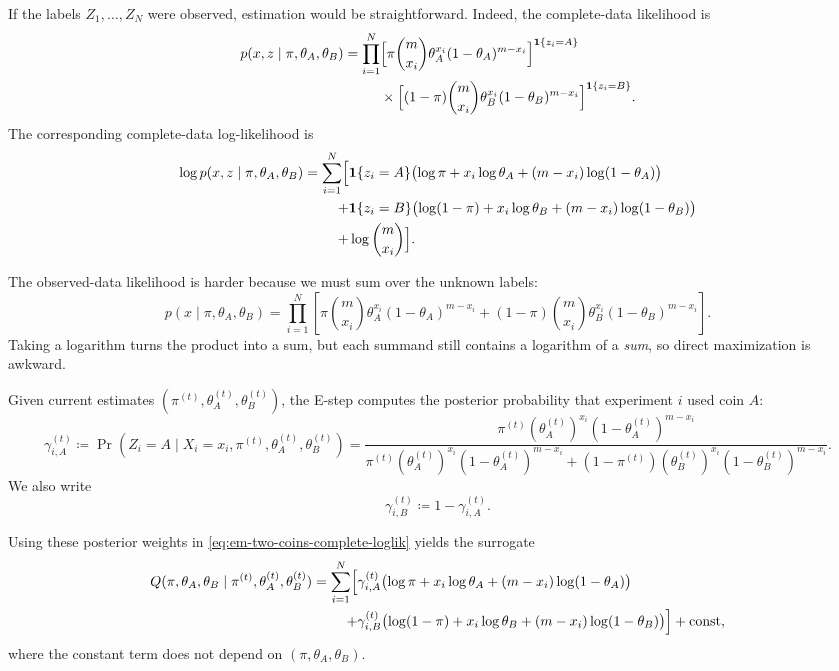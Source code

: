 \documentclass[11pt]{article}
\begin{document}
If the labels $Z_1,\dots,Z_N$ were observed, estimation would be straightforward.
Indeed, the complete-data likelihood is
\begin{align}
  p(x,z\mid \pi,\theta_A,\theta_B)
  =
  \prod_{i=1}^N
  &\Bigl[
    \pi \binom{m}{x_i}\theta_A^{x_i}(1-\theta_A)^{m-x_i}
  \Bigr]^{\mathbf{1}\{z_i=A\}}
  \nonumber\\
  &\times
  \Bigl[
    (1-\pi)\binom{m}{x_i}\theta_B^{x_i}(1-\theta_B)^{m-x_i}
  \Bigr]^{\mathbf{1}\{z_i=B\}}.
  \label{eq:em-two-coins-complete}
\end{align}
The corresponding complete-data log-likelihood is
\begin{align}
  \log p(x,z\mid \pi,\theta_A,\theta_B)
  =
  \sum_{i=1}^N
  \Bigl[
    &\mathbf{1}\{z_i=A\}\bigl(\log \pi + x_i\log \theta_A + (m-x_i)\log(1-\theta_A)\bigr)
    \nonumber\\
    +
    &\mathbf{1}\{z_i=B\}\bigl(\log(1-\pi) + x_i\log \theta_B + (m-x_i)\log(1-\theta_B)\bigr)
    \nonumber\\
    +
    &\log \binom{m}{x_i}
  \Bigr].
  \label{eq:em-two-coins-complete-loglik}
\end{align}

The observed-data likelihood is harder because we must sum over the unknown labels:
\begin{equation}
  p(x\mid \pi,\theta_A,\theta_B)
  =
  \prod_{i=1}^N
  \left[
    \pi \binom{m}{x_i}\theta_A^{x_i}(1-\theta_A)^{m-x_i}
    +
    (1-\pi)\binom{m}{x_i}\theta_B^{x_i}(1-\theta_B)^{m-x_i}
  \right].
  \label{eq:em-two-coins-observed-likelihood}
\end{equation}
Taking a logarithm turns the product into a sum, but each summand still contains a logarithm of a \emph{sum}, so direct maximization is awkward.

Given current estimates $(\pi^{(t)},\theta_A^{(t)},\theta_B^{(t)})$, the E-step computes the posterior probability that experiment $i$ used coin $A$:
\begin{equation}
  \gamma_{i,A}^{(t)}
  \coloneqq
  \Pr(Z_i=A\mid X_i=x_i,\pi^{(t)},\theta_A^{(t)},\theta_B^{(t)})
  =
  \frac{
    \pi^{(t)} (\theta_A^{(t)})^{x_i}(1-\theta_A^{(t)})^{m-x_i}
  }{
    \pi^{(t)} (\theta_A^{(t)})^{x_i}(1-\theta_A^{(t)})^{m-x_i}
    +
    (1-\pi^{(t)}) (\theta_B^{(t)})^{x_i}(1-\theta_B^{(t)})^{m-x_i}
  }.
  \label{eq:em-two-coins-responsibility}
\end{equation}
We also write
\[
\gamma_{i,B}^{(t)}\coloneqq 1-\gamma_{i,A}^{(t)}.
\]

Using these posterior weights in \eqref{eq:em-two-coins-complete-loglik} yields the surrogate
\begin{align}
  Q(\pi,\theta_A,\theta_B \mid \pi^{(t)},\theta_A^{(t)},\theta_B^{(t)})
  =
  \sum_{i=1}^N
  \Bigl[
    &\gamma_{i,A}^{(t)}\bigl(\log \pi + x_i\log \theta_A + (m-x_i)\log(1-\theta_A)\bigr)
    \nonumber\\
    +
    &\gamma_{i,B}^{(t)}\bigl(\log(1-\pi) + x_i\log \theta_B + (m-x_i)\log(1-\theta_B)\bigr)
  \Bigr]
  + \text{const},
  \label{eq:em-two-coins-q}
\end{align}
where the constant term does not depend on $(\pi,\theta_A,\theta_B)$.
\end{document}
